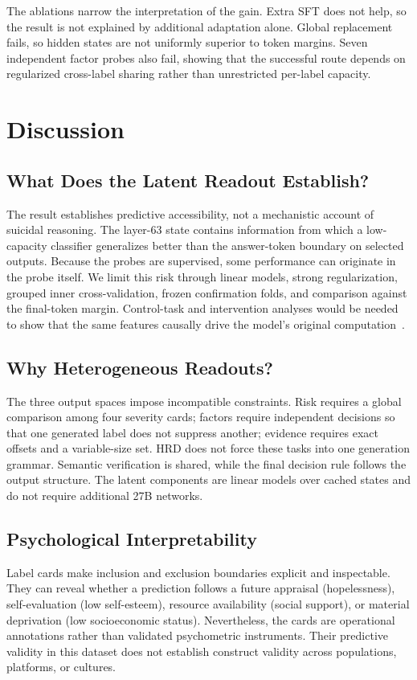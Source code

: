 \documentclass[conference]{IEEEtran}
\newcommand{\method}{\textsc{HRD}}
\begin{document}
The ablations narrow the interpretation of the gain. Extra SFT does not help, so the result is not explained by additional adaptation alone. Global replacement fails, so hidden states are not uniformly superior to token margins. Seven independent factor probes also fail, showing that the successful route depends on regularized cross-label sharing rather than unrestricted per-label capacity.

\section{Discussion}
\subsection{What Does the Latent Readout Establish?}
The result establishes predictive accessibility, not a mechanistic account of suicidal reasoning. The layer-63 state contains information from which a low-capacity classifier generalizes better than the answer-token boundary on selected outputs. Because the probes are supervised, some performance can originate in the probe itself. We limit this risk through linear models, strong regularization, grouped inner cross-validation, frozen confirmation folds, and comparison against the final-token margin. Control-task and intervention analyses would be needed to show that the same features causally drive the model's original computation~\cite{hewitt2019probes,belinkov2022probing}.

\subsection{Why Heterogeneous Readouts?}
The three output spaces impose incompatible constraints. Risk requires a global comparison among four severity cards; factors require independent decisions so that one generated label does not suppress another; evidence requires exact offsets and a variable-size set. \method{} does not force these tasks into one generation grammar. Semantic verification is shared, while the final decision rule follows the output structure. The latent components are linear models over cached states and do not require additional 27B networks.

\subsection{Psychological Interpretability}
Label cards make inclusion and exclusion boundaries explicit and inspectable. They can reveal whether a prediction follows a future appraisal (hopelessness), self-evaluation (low self-esteem), resource availability (social support), or material deprivation (low socioeconomic status). Nevertheless, the cards are operational annotations rather than validated psychometric instruments. Their predictive validity in this dataset does not establish construct validity across populations, platforms, or cultures.
\end{document}
